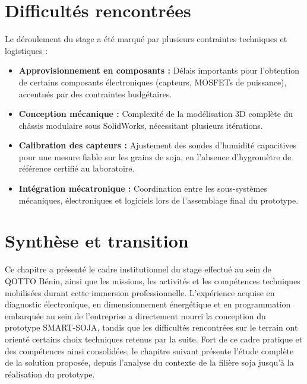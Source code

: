 \section{Difficultés rencontrées}
Le déroulement du stage a été marqué par plusieurs contraintes techniques et logistiques :
\begin{itemize}
    \item \textbf{Approvisionnement en composants :} Délais importants pour l'obtention de certains composants électroniques (capteurs, MOSFETs de puissance), accentués par des contraintes budgétaires.
    \item \textbf{Conception mécanique :} Complexité de la modélisation 3D complète du châssis modulaire sous SolidWorks, nécessitant plusieurs itérations.
    \item \textbf{Calibration des capteurs :} Ajustement des sondes d'humidité capacitives pour une mesure fiable sur les grains de soja, en l'absence d'hygromètre de référence certifié au laboratoire.
    \item \textbf{Intégration mécatronique :} Coordination entre les sous-systèmes mécaniques, électroniques et logiciels lors de l'assemblage final du prototype.
\end{itemize}

\section*{Synthèse et transition}
Ce chapitre a présenté le cadre institutionnel du stage effectué au sein de QOTTO Bénin, ainsi que les missions, les activités et les compétences techniques mobilisées durant cette immersion professionnelle. L'expérience acquise en diagnostic électronique, en dimensionnement énergétique et en programmation embarquée au sein de l'entreprise a directement nourri la conception du prototype SMART-SOJA, tandis que les difficultés rencontrées sur le terrain ont orienté certains choix techniques retenus par la suite. Fort de ce cadre pratique et des compétences ainsi consolidées, le chapitre suivant présente l'étude complète de la solution proposée, depuis l'analyse du contexte de la filière soja jusqu'à la réalisation du prototype.
